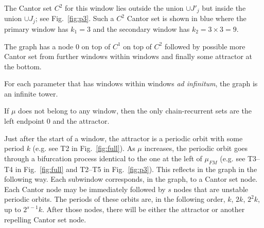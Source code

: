\documentclass{article}
\newcommand{\allblack}{\color{black}{}}
\newcommand{\jim}{\color{black} }
\begin{document}
The Cantor set $C^2$ for this window lies outside the union $\cup J'_j$ but inside the union  $\cup J_j$; see Fig.~\ref{fig:p3}. 
Such a $C^2$ Cantor set is shown in blue where the primary window has $k_1=3$ and the secondary window has $k_2= 3\times3 =9.$

The graph has a node $0$ on top of $C^1$ on top of $C^2$ followed by possible more Cantor set from further windows within windows and finally some attractor at the bottom.

{\jim
For each parameter that has windows within windows {\em ad infinitum}, the graph is an infinite tower. 
}

%
\allblack
\bigskip{}
%
If $\mu$ does not belong to any window, then the only chain-recurrent sets are the left endpoint 0 and the attractor.

Just after the start of a window, the attractor is a periodic orbit with some period $k$ (e.g. see T2 in Fig.~\ref{fig:full}). 
As $\mu$ increases, the periodic orbit goes through a bifurcation process identical to the one at the left of $\mu_{FM}$ (e.g. see T3--T4 in Fig.~\ref{fig:full} and T2--T5 in Fig.~\ref{fig:p3}). 
This reflects in the graph in the following way. 
Each subwindow corresponds, in the graph, to a Cantor set node. 
Each Cantor node may be immediately followed by $s$ nodes that are unstable periodic orbits. The periods of these orbits are, in the following order, $k$, $2k$, $2^2k$, up to $2^{s-1}k$. 
After those nodes, there will be either the attractor or another repelling Cantor set node. 
\end{document}
